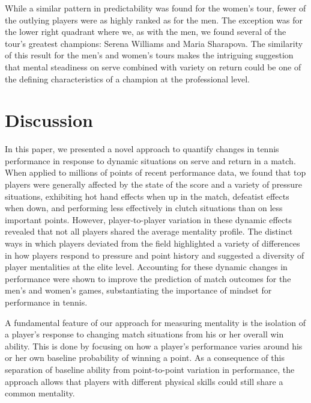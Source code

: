 \documentclass{Latex/svjour3}
\begin{document}
While a similar pattern in predictability was found for the women's tour, fewer
of the outlying players were as highly ranked as for the men. The exception was
for the lower right quadrant where we, as with the men, we found several of the
tour's greatest champions: Serena Williams and Maria Sharapova. The similarity
of this result for the men's and women's tours makes the intriguing suggestion
that mental steadiness on serve combined with variety on return could be one of
the defining characteristics of a champion at the professional level.



\section{Discussion}

In this paper, we presented a novel approach to quantify changes in tennis
performance in response to dynamic situations on serve and return in a
match. When applied to millions of points of recent performance data, we found
that top players were generally affected by the state of the score and a variety
of pressure situations, exhibiting hot hand effects when up in the match,
defeatist effects when down, and performing less effectively in clutch
situations than on less important points. However, player-to-player variation in
these dynamic effects revealed that not all players shared the average mentality
profile. The distinct ways in which players deviated from the field highlighted
a variety of differences in how players respond to pressure and point history
and suggested a diversity of player mentalities at the elite level. Accounting
for these dynamic changes in performance were shown to improve the prediction of
match outcomes for the men's and women's games, substantiating the importance of
mindset for performance in tennis.


A fundamental feature of our approach for measuring mentality is the isolation
of a player's response to changing match situations from his or her overall win
ability. This is done by focusing on how a player's performance varies around
his or her own baseline probability of winning a point. As a consequence of this
separation of baseline ability from point-to-point variation in performance, the
approach allows that players with different physical skills could still share a
common mentality.
\end{document}
